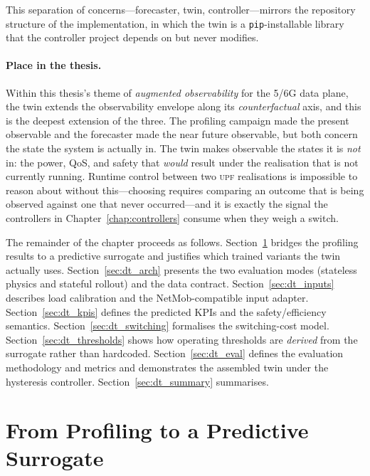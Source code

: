 \documentclass[12pt, a4paper]{report}
\newcommand{\upf}{\textsc{upf}}
\newcommand{\code}[1]{\texttt{#1}}
\begin{document}
This separation of concerns---forecaster, twin, controller---mirrors the
repository structure of the implementation, in which the twin is a
\code{pip}-installable library that the controller project depends on but
never modifies.

\paragraph{Place in the thesis.} Within this thesis's theme of \emph{augmented
observability} for the 5/6G data plane, the twin extends the observability
envelope along its \emph{counterfactual} axis, and this is the deepest extension
of the three. The profiling campaign made the present observable and the
forecaster made the near future observable, but both concern the state the system
is actually in. The twin makes observable the states it is \emph{not} in: the
power, QoS, and safety that \emph{would} result under the realisation that is not
currently running. Runtime control between two \upf{} realisations is impossible
to reason about without this---choosing requires comparing an outcome that is
being observed against one that never occurred---and it is exactly the signal the
controllers in Chapter~\ref{chap:controllers} consume when they weigh a switch.

The remainder of the chapter proceeds as follows.
Section~\ref{sec:dt_from_profiling} bridges the profiling results to a
predictive surrogate and justifies which trained variants the twin actually
uses. Section~\ref{sec:dt_arch} presents the two evaluation modes (stateless
physics and stateful rollout) and the data contract.
Section~\ref{sec:dt_inputs} describes load calibration and the
NetMob-compatible input adapter. Section~\ref{sec:dt_kpis} defines the
predicted KPIs and the safety/efficiency semantics.
Section~\ref{sec:dt_switching} formalises the switching-cost model.
Section~\ref{sec:dt_thresholds} shows how operating thresholds are
\emph{derived} from the surrogate rather than hardcoded.
Section~\ref{sec:dt_eval} defines the evaluation methodology and metrics and
demonstrates the assembled twin under the hysteresis controller.
Section~\ref{sec:dt_summary} summarises.

\section{From Profiling to a Predictive Surrogate}
\label{sec:dt_from_profiling}
\end{document}

